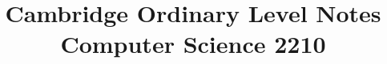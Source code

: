 \documentclass{article}
\title{Cambridge Ordinary Level Notes \\ Computer Science 2210}
\begin{document}
\maketitle{}\newpage\tableofcontents


\end{document}
